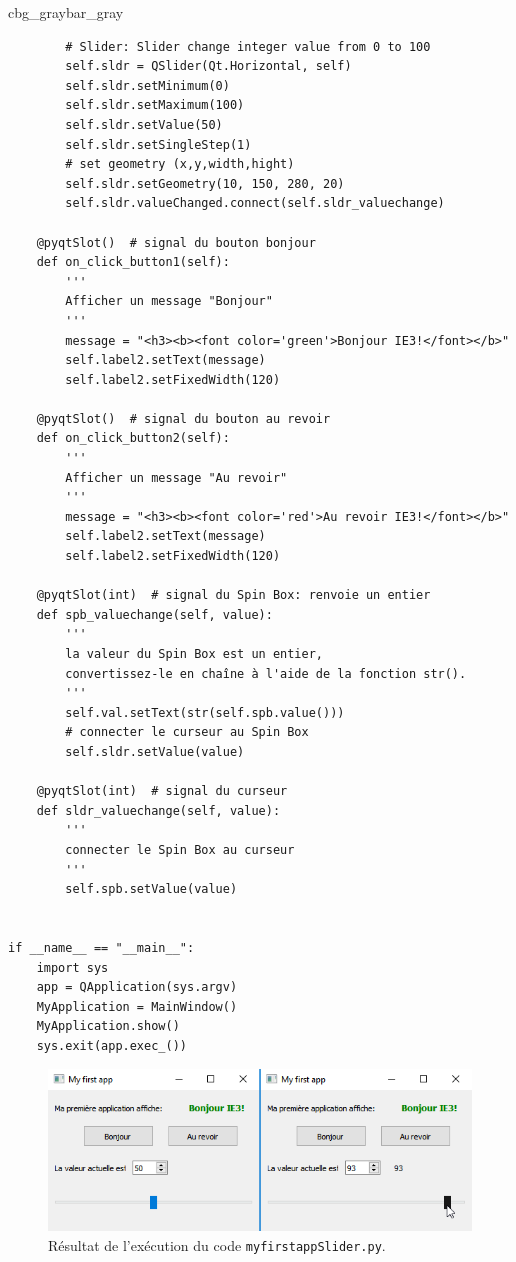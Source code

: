 \documentclass[%
oneside,                 %
final,                   %
10pt,french]{article}
\newenvironment{_pro_tight}[2]{
   \def\FrameCommand{\color{#2}\vrule width 1mm\normalcolor\colorbox{#1}}
   \FrameRule0.6pt\MakeFramed {\advance\hsize-2mm\FrameRestore}\vskip3mm}
   {\vskip0mm\endMakeFramed}
\newenvironment{pro}[2]{
\bgroup\rmfamily
\fboxsep=0mm\relax
\begin{_pro_tight}{#1}{#2}
\list{}{\parsep=-2mm\parskip=0mm\topsep=0pt\leftmargin=2mm
\rightmargin=2\leftmargin\leftmargin=4pt\relax}
\item\relax}
{\endlist\end{_pro_tight}\egroup}
\begin{document}
\begin{pro}{cbg_gray}{bar_gray}
\begin{verbatim}
        # Slider: Slider change integer value from 0 to 100
        self.sldr = QSlider(Qt.Horizontal, self)
        self.sldr.setMinimum(0)
        self.sldr.setMaximum(100)
        self.sldr.setValue(50)
        self.sldr.setSingleStep(1)
        # set geometry (x,y,width,hight)
        self.sldr.setGeometry(10, 150, 280, 20)
        self.sldr.valueChanged.connect(self.sldr_valuechange)

    @pyqtSlot()  # signal du bouton bonjour
    def on_click_button1(self):
        '''
        Afficher un message "Bonjour"
        '''
        message = "<h3><b><font color='green'>Bonjour IE3!</font></b>"
        self.label2.setText(message)
        self.label2.setFixedWidth(120)

    @pyqtSlot()  # signal du bouton au revoir
    def on_click_button2(self):
        '''
        Afficher un message "Au revoir"
        '''
        message = "<h3><b><font color='red'>Au revoir IE3!</font></b>"
        self.label2.setText(message)
        self.label2.setFixedWidth(120)

    @pyqtSlot(int)  # signal du Spin Box: renvoie un entier
    def spb_valuechange(self, value):
        '''
        la valeur du Spin Box est un entier,
        convertissez-le en chaîne à l'aide de la fonction str().
        '''
        self.val.setText(str(self.spb.value()))
        # connecter le curseur au Spin Box
        self.sldr.setValue(value)

    @pyqtSlot(int)  # signal du curseur
    def sldr_valuechange(self, value):
        '''
        connecter le Spin Box au curseur
        '''
        self.spb.setValue(value)


if __name__ == "__main__":
    import sys
    app = QApplication(sys.argv)
    MyApplication = MainWindow()
    MyApplication.show()
    sys.exit(app.exec_())
\end{verbatim}
\end{pro}
\noindent


\begin{figure}[!ht]  %
  \centerline{\includegraphics[width=0.4\linewidth]{imgs/myfirstappSlider.png}}
  \caption{
  Résultat de l'exécution du code \texttt{myfirstappSlider.py}. \label{fig:myfirstappSlider}
  }
\end{figure}
\end{document}
